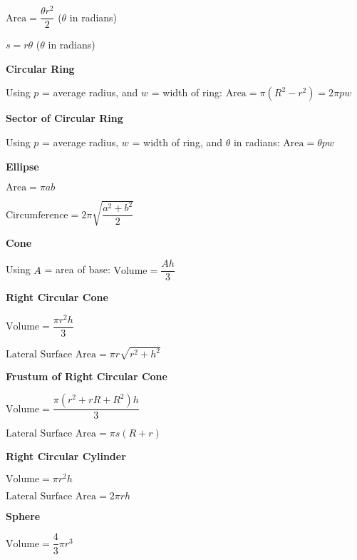 \documentclass{article}
\begin{document}
\begin{large}
\hspace{0.1in} $\text{Area} = \dfrac{\theta r^{2}}{2}$ ($\theta$ in radians)

\hspace{0.1in} $s = r\theta$ ($\theta$ in radians)

\textbf{Circular Ring}

\hspace{0.1in} Using $p$ = average radius, and $w$ = width of ring: $\text{Area} = \pi(R^{2} - r^{2}) = 2\pi pw$

\textbf{Sector of Circular Ring}

\hspace{0.1in} Using $p$ = average radius, $w$ = width of ring, and $\theta$ in radians: $\text{Area} = \theta pw$

\textbf{Ellipse}

\hspace{0.1in} $\text{Area} = \pi ab$

\hspace{0.1in} $\text{Circumference} = 2\pi\sqrt{\dfrac{a^{2} + b^{2}}{2}}$

\textbf{Cone}

\hspace{0.1in} Using $A$ = area of base: $\text{Volume} = \dfrac{Ah}{3}$

\textbf{Right Circular Cone}

\hspace{0.1in} $\text{Volume} = \dfrac{\pi r^{2}h}{3}$

\hspace{0.1in} $\text{Lateral Surface Area} = \pi r\sqrt{r^{2} + h^{2}}$

\textbf{Frustum of Right Circular Cone}

\hspace{0.1in} $\text{Volume} = \dfrac{\pi(r^{2} + rR + R^{2})h}{3}$

\hspace{0.1in} $\text{Lateral Surface Area} = \pi s(R + r)$

\textbf{Right Circular Cylinder}

\hspace{0.1in} $\text{Volume} = \pi r^{2}h$

\hspace{0.1in} $\text{Lateral Surface Area} = 2\pi rh$

\textbf{Sphere}

\hspace{0.1in} $\text{Volume} = \dfrac{4}{3}\pi r^3$


\end{large}
\end{document}
